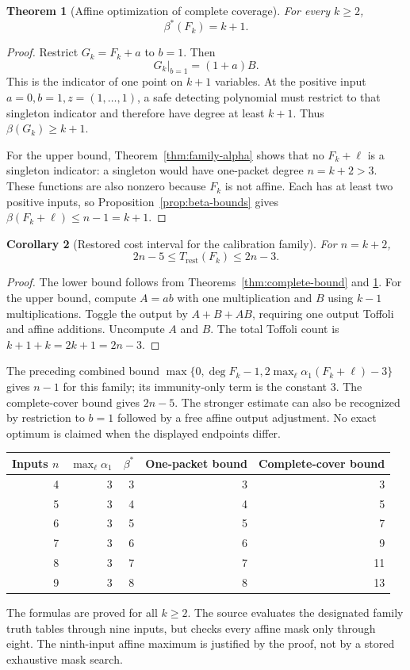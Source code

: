 \documentclass[11pt,letterpaper,oneside]{report}
\theoremstyle{komorebi}
\newtheorem{theorem}{Theorem}[chapter]
\newtheorem{corollary}[theorem]{Corollary}
\newcommand{\KTrest}{T_{\mathrm{rest}}}
\begin{document}
\begin{theorem}[Affine optimization of complete coverage]\label{thm:family-beta}
For every $k\ge2$,
\[
 \beta^*(F_k)=k+1.
\]
\end{theorem}
\begin{proof}
Restrict $G_k=F_k+a$ to $b=1$. Then
\[
 G_k|_{b=1}=(1+a)B.
\]
This is the indicator of one point on $k+1$ variables. At the positive input $a=0,b=1,z=(1,\ldots,1)$, a safe detecting polynomial must restrict to that singleton indicator and therefore have degree at least $k+1$. Thus $\beta(G_k)\ge k+1$.

For the upper bound, Theorem~\ref{thm:family-alpha} shows that no $F_k+\ell$ is a singleton indicator: a singleton would have one-packet degree $n=k+2>3$. These functions are also nonzero because $F_k$ is not affine. Each has at least two positive inputs, so Proposition~\ref{prop:beta-bounds} gives $\beta(F_k+\ell)\le n-1=k+1$.
\end{proof}

\begin{corollary}[Restored cost interval for the calibration family]\label{cor:family-cost}
For $n=k+2$,
\[
 2n-5\le\KTrest(F_k)\le2n-3.
\]
\end{corollary}
\begin{proof}
The lower bound follows from Theorems~\ref{thm:complete-bound} and \ref{thm:family-beta}. For the upper bound, compute $A=ab$ with one multiplication and $B$ using $k-1$ multiplications. Toggle the output by $A+B+AB$, requiring one output Toffoli and affine additions. Uncompute $A$ and $B$. The total Toffoli count is $k+1+k=2k+1=2n-3$.
\end{proof}

The preceding combined bound $\max\{0,\deg F_k-1,2\max_{\ell}\alpha_1(F_k+\ell)-3\}$ gives $n-1$ for this family; its immunity-only term is the constant $3$. The complete-cover bound gives $2n-5$. The stronger estimate can also be recognized by restriction to $b=1$ followed by a free affine output adjustment. No exact optimum is claimed when the displayed endpoints differ.

\begin{center}
\begin{tabular}{@{}rrrrr@{}}
\toprule
Inputs $n$ & $\max_\ell\alpha_1$ & $\beta^*$ & One-packet bound & Complete-cover bound\\\midrule
4 & 3 & 3 & 3 & 3\\
5 & 3 & 4 & 4 & 5\\
6 & 3 & 5 & 5 & 7\\
7 & 3 & 6 & 6 & 9\\
8 & 3 & 7 & 7 & 11\\
9 & 3 & 8 & 8 & 13\\
\bottomrule
\end{tabular}
\end{center}
The formulas are proved for all $k\ge2$. The source evaluates the designated family truth tables through nine inputs, but checks every affine mask only through eight. The ninth-input affine maximum is justified by the proof, not by a stored exhaustive mask search.
\end{document}
